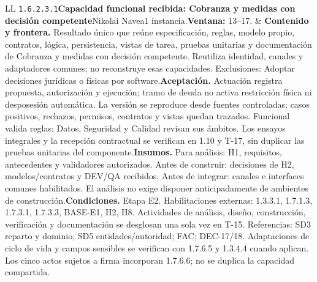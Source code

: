 \begin{longtable}{L{\tabcolsep\relax}L{\tabcolsep\relax}}
\texttt{1.\allowbreak{}6.\allowbreak{}2.\allowbreak{}3.\allowbreak{}1}\newline{}\textbf{Capacidad funcional recibida: Cobranza y medidas con decisión competente}\newline{}Nikolai Navea\newline{}1 instancia.\newline{}\textbf{Ventana:} 13--17. & \textbf{Contenido y frontera.} Resultado único que reúne especificación, reglas, modelo propio, contratos, lógica, persistencia, vistas de tarea, pruebas unitarias y documentación de Cobranza y medidas con decisión competente. Reutiliza identidad, canales y adaptadores comunes; no reconstruye esas capacidades. Exclusiones: Adoptar decisiones jurídicas o físicas por software.\newline{}\textbf{Aceptación.} Actuación registra propuesta, autorización y ejecución; tramo de deuda no activa restricción física ni desposesión automática. La versión se reproduce desde fuentes controladas; casos positivos, rechazos, permisos, contratos y vistas quedan trazados. Funcional valida reglas; Datos, Seguridad y Calidad revisan sus ámbitos. Los ensayos integrales y la recepción contractual se verifican en 1.10 y T-17, sin duplicar las pruebas unitarias del componente.\newline{}\textbf{Insumos.} Para análisis: H1, requisitos, antecedentes y validadores autorizados. Antes de construir: decisiones de H2, modelos/contratos y DEV/QA recibidos. Antes de integrar: canales e interfaces comunes habilitados. El análisis no exige disponer anticipadamente de ambientes de construcción.\newline{}\textbf{Condiciones.} Etapa E2. Habilitaciones externas: 1.3.3.1, 1.7.1.3, 1.7.3.1, 1.7.3.3, BASE-E1, H2, H8. Actividades de análisis, diseño, construcción, verificación y documentación se desglosan una sola vez en T-15. Referencias: SD3 reparto y dominio, SD5 entidades/autoridad; FAC; DEC-17/18. Adaptaciones de ciclo de vida y campos sensibles se verifican con 1.7.6.5 y 1.3.4.4 cuando aplican. Los cinco actos sujetos a firma incorporan 1.7.6.6; no se duplica la capacidad compartida.\\\hline

\end{longtable}
